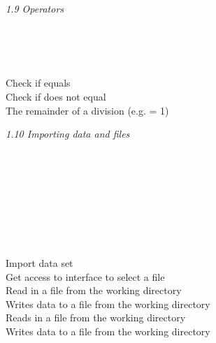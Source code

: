 \textit{1.9 Operators} \\
\\
\begin{minipage}[t]{.4\textwidth}
\vspace*{-8pt}
 \\			
 \\				
\rcode{\%\% } 	
\end{minipage}
\begin{minipage}[t]{.6\textwidth}
Check if  equals  \\
Check if  does not equal  \\
The remainder of a division (e.g.  = 1)	
\end{minipage}
\vspace*{.5cm}

\textit{1.10 Importing data and files} \\
\\
\begin{minipage}[t]{.4\textwidth}
\vspace*{-8pt}
 \\ 				
 \\ 			
 \\  			
 \\ 		
 \\ 		
 \\ 		
\end{minipage}
\begin{minipage}[t]{.6\textwidth}
Import data set  \\
Get access to interface to select a file \\
Read in a  file  from the working directory \\
Writes data  to a  file from the working directory \\
Reads in a  file  from the working directory \\
Writes data  to a  file from the working directory 
\end{minipage}
\vspace*{.5cm}

\clearpage %

